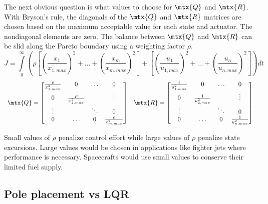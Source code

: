 The next obvious question is what values to choose for $\mtx{Q}$ and $\mtx{R}$.
With Bryson's rule, the diagonals of the $\mtx{Q}$ and $\mtx{R}$ matrices are
chosen based on the maximum acceptable value for each \gls{state} and actuator.
The nondiagonal elements are zero. The balance between $\mtx{Q}$ and $\mtx{R}$
can be slid along the Pareto boundary using a weighting factor $\rho$.
\begin{equation*}
  J = \int\limits_0^\infty \left(\rho \left[
    \left(\frac{x_1}{x_{1,max}}\right)^2 + \ldots +
    \left(\frac{x_m}{x_{m,max}}\right)^2\right] + \left[
    \left(\frac{u_1}{u_{1,max}}\right)^2 + \ldots +
    \left(\frac{u_n}{u_{n,max}}\right)^2\right]\right) dt
\end{equation*}
\begin{equation*}
  \begin{array}{cc}
    \mtx{Q} = \begin{bmatrix}
      \frac{\rho}{x_{1,max}^2} & 0 & \ldots & 0 \\
      0 & \frac{\rho}{x_{2,max}^2} & & \vdots \\
      \vdots & & \ddots & 0 \\
      0 & \ldots & 0 & \frac{\rho}{x_{m,max}^2}
    \end{bmatrix} &
    \mtx{R} = \begin{bmatrix}
      \frac{1}{u_{1,max}^2} & 0 & \ldots & 0 \\
      0 & \frac{1}{u_{2,max}^2} & & \vdots \\
      \vdots & & \ddots & 0 \\
      0 & \ldots & 0 & \frac{1}{u_{n,max}^2}
    \end{bmatrix}
  \end{array}
\end{equation*}

Small values of $\rho$ penalize \gls{control effort} while large values of
$\rho$ penalize \gls{state} excursions. Large values would be chosen in
applications like fighter jets where performance is necessary. Spacecrafts would
use small values to conserve their limited fuel supply.

\subsection{Pole placement vs LQR}

